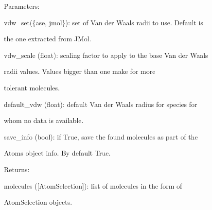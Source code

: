 \documentclass[letterpaper,10pt,english]{sphinxmanual}
\begin{document}
\begin{fulllineitems}
\begin{DUlineblock}{0em}
\item[] Parameters:
\item[]
\begin{DUlineblock}{\DUlineblockindent}
\item[] vdw\_set(\{ase, jmol\}): set of Van der Waals radii to use. Default is
\item[]
\begin{DUlineblock}{\DUlineblockindent}
\item[] the one extracted from JMol.
\end{DUlineblock}
\item[] vdw\_scale (float): scaling factor to apply to the base Van der Waals
\item[]
\begin{DUlineblock}{\DUlineblockindent}
\item[] radii values. Values bigger than one make for more
\item[] tolerant molecules.
\end{DUlineblock}
\item[] default\_vdw (float): default Van der Waals radius for species for
\item[]
\begin{DUlineblock}{\DUlineblockindent}
\item[] whom no data is available.
\end{DUlineblock}
\item[] save\_info (bool): if True, save the found molecules as part of the
\item[]
\begin{DUlineblock}{\DUlineblockindent}
\item[] Atoms object info. By default True.
\end{DUlineblock}
\end{DUlineblock}
\end{DUlineblock}

\begin{DUlineblock}{0em}
\item[] Returns:
\item[]
\begin{DUlineblock}{\DUlineblockindent}
\item[] molecules ({[}AtomSelection{]}): list of molecules in the form of
\item[]
\begin{DUlineblock}{\DUlineblockindent}
\item[] AtomSelection objects.
\end{DUlineblock}
\end{DUlineblock}
\end{DUlineblock}


\end{fulllineitems}
\end{document}
